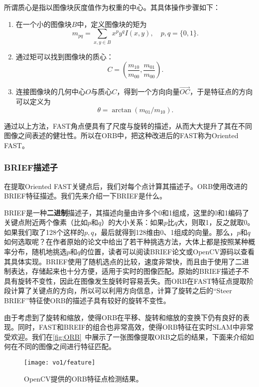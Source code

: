 所谓质心是指以图像块灰度值作为权重的中心。其具体操作步骤如下\textsuperscript{\cite{rosin1999measuring}}：
\begin{enumerate}
\item 在一个小的图像块$B$中，定义图像块的矩为
\[
m_{pq}=\sum_{x,y \in B}x^{p}y^{q}I(x,y), \quad p, q = \{0,1\}.
\]
\item 通过矩可以找到图像块的质心：
\[
C=(\frac{m_{10}}{m_{00}},\frac{m_{01}}{m_{00}}).
\]
\item 连接图像块的几何中心$O$与质心$C$，得到一个方向向量$\overrightarrow{OC}$，于是特征点的方向可以定义为
\[
\theta = \arctan(m_{01}/m_{10}).
\]
\end{enumerate}
通过以上方法，FAST角点便具有了尺度与旋转的描述，从而大大提升了其在不同图像之间表述的健壮性。所以在ORB中，把这种改进后的FAST称为Oriented FAST。

\subsubsection{BRIEF描述子}
在提取Oriented FAST关键点后，我们对每个点计算其描述子。ORB使用改进的BRIEF特征描述。我们先来介绍一下BRIEF是什么。

BRIEF是一种\textbf{二进制}描述子，其描述向量由许多个0和1组成，这里的0和1编码了关键点附近两个像素（比如$p$和$q$）的大小关系：如果$p$比$q$大，则取1，反之就取0。如果我们取了128个这样的$p,q$，最后就得到128维由0、1组成的向量。那么，$p$和$q$如何选取呢？在作者原始的论文中给出了若干种挑选方法，大体上都是按照某种概率分布，随机地挑选$p$和$q$的位置，读者可以阅读BRIEF论文或OpenCV源码以查看其具体实现\textsuperscript{\cite{calonder2010brief}}。BRIEF使用了随机选点的比较，速度非常快，而且由于使用了二进制表达，存储起来也十分方便，适用于实时的图像匹配。原始的BRIEF描述子不具有旋转不变性，因此在图像发生旋转时容易丢失。而ORB在FAST特征点提取阶段计算了关键点的方向，所以可以利用方向信息，计算了旋转之后的“Steer BRIEF”特征使ORB的描述子具有较好的旋转不变性。

由于考虑到了旋转和缩放，使得ORB在平移、旋转和缩放的变换下仍有良好的表现。同时，FAST和BREIF的组合也非常高效，使得ORB特征在实时SLAM中非常受欢迎。我们在\autoref{fig:ORB}~中展示了一张图像提取ORB之后的结果，下面来介绍如何在不同的图像之间进行特征匹配。

\begin{figure}[!htp]
    \centering
    \texttt{[image: vo1/feature]}\\
    \caption{OpenCV提供的ORB特征点检测结果。}
    \label{fig:ORB}
\end{figure}

